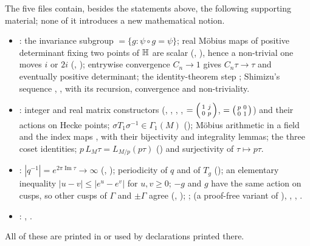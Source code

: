 The five files contain, besides the statements above, the following supporting material; none of it introduces a new
mathematical notion.
\begin{itemize}
\item {}: the invariance subgroup
   $=\{g:\psi\circ g=\psi\}$; real M\"obius maps of positive determinant fixing two
  points of $\mathbb{H}$ are scalar (, ), hence a non-trivial
  one moves $i$ or $2i$ (, ); entrywise convergence
  $C_n\to1$ gives $C_n\tau\to\tau$ and eventually positive determinant; the identity-theorem step
  ; Shimizu's sequence , ,
   with its recursion, convergence and non-triviality.
\item {}: integer and real matrix constructors
  (, , , ,  $=\left(\begin{smallmatrix}1&j\\0&p\end{smallmatrix}\right)$,
   $=\left(\begin{smallmatrix}p&0\\0&1\end{smallmatrix}\right)$) and their actions on Hecke points; $\sigma T_1\sigma^{-1}\in\Gamma_1(M)$
  (); M\"obius arithmetic in a field and the index maps ,
   with their bijectivity and integrality lemmas; the three coset identities; $p\,L_M\tau=L_{M/p}(p\tau)$
  () and surjectivity of $\tau\mapsto p\tau$.
\item {}: $|q^{-1}|=e^{2\pi\operatorname{Im}\tau}\to\infty$
  (, ); periodicity of $q$ and of $T_g$
  (); an elementary inequality $|u-v|\le|e^u-e^v|$ for $u,v\ge0$; $-g$ and $g$ have the
  same action on cusps, so other cusps of $\Gamma$ and $\pm\Gamma$ agree (,
  ); ;  (a proof-free variant of
  ), , ,
  .
\item {}: ,
  .
\end{itemize}
All of these are printed in  or used by declarations printed
there.

